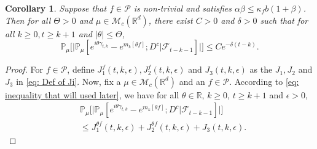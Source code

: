 \documentclass[12pt,a4paper]{amsart}
\theoremstyle{plain}
\newtheorem{cor}[thm]{Corollary}
\theoremstyle{definition}
\numberwithin{equation}{section}
\begin{document}
\begin{cor}\label{cor: used in next corollary}
   Suppose that $f\in \mathcal{P}$ is non-trivial and satisfies $\alpha\beta\leq \kappa_fb(1+\beta)$.
    Then for all $\Theta >0$ and $\mu\in \mathcal M_c(\mathbb R^d)$, there exist $C>0$ and $\delta>0$ such that for all $k \geq 0, t\geq k+1$ and $|\theta|\leq \Theta$,
\begin{equation}
    \mathbb{P}_{\mu}\Big[\big|\mathbb{P}_{\mu}[e^{i\theta\gamma_{t,k}}-e^{m_k[\theta f]}; D^c | \mathscr F_{t-k-1}]\big|\Big]
    \leq Ce^{-\delta(t-k)}.
\end{equation}
\end{cor}
\begin{proof}
	For  $f\in \mathcal P$, define $J_1^f(t,k,\epsilon), J_2^f(t,k,\epsilon)$ and $J_3(t,k,\epsilon)$ as the $J_1, J_2$ and $J_3$ in \eqref{eq: Def of Ji}.
	Now, fix a $\mu \in \mathcal M_c(\mathbb R^d)$ and an $f\in \mathcal P$.
    According to \eqref{eq: inequality that will used later},  we have for all $\theta\in \mathbb R$, $k\geq 0$, $t\geq k+1$ and $\epsilon> 0$,
\begin{align}
    &\mathbb{P}_{\mu}\Big[\big| \mathbb{P}_{\mu}[e^{i\theta \gamma_{t,k}}-e^{m_k[\theta f]}; D^c | \mathscr F_{t-k-1}]\big|\Big]
    \\&\leq J^{\theta f}_1(t,k,\epsilon) + J^{\theta f}_2(t,k,\epsilon)+J_3(t,k,\epsilon).
\end{align}


\end{proof}
\end{document}
